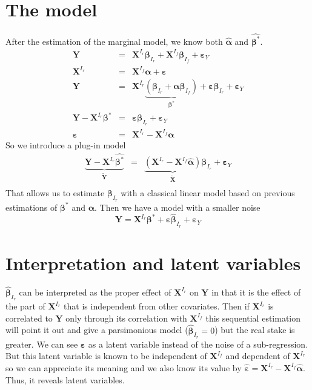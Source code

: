 \documentclass[12pt,a4paper]{report}
\begin{document}
	\section{The model}
		After the estimation of the marginal model, we know both $\hat{\boldsymbol{\alpha}}$ and $\hat{\boldsymbol{\beta}^*}$.
		\begin{eqnarray}
			\boldsymbol{Y}&=& \boldsymbol{X}^{I_r}\boldsymbol{\beta}_{I_r}+\boldsymbol{X}^{I_f}\boldsymbol{\beta}_{I_f}+\boldsymbol{\varepsilon}_Y \\
			\boldsymbol{X}^{I_r}&=&\boldsymbol{X}^{I_f}\boldsymbol{\alpha}+\boldsymbol{\varepsilon} \\
			\boldsymbol{Y}&=& \boldsymbol{X}^{I_r}\underbrace{(\boldsymbol{\beta}_{I_r}+\boldsymbol{\alpha}\boldsymbol{\beta}_{I_f})}_{\boldsymbol{\beta}^*}+\boldsymbol{\varepsilon}\boldsymbol{\beta}_{I_r}+\boldsymbol{\varepsilon}_Y \\
			\boldsymbol{Y}- \boldsymbol{X}^{I_r}\boldsymbol{\beta}^*&=&\boldsymbol{\varepsilon}\boldsymbol{\beta}_{I_r}+\boldsymbol{\varepsilon}_Y \\
			\boldsymbol{\varepsilon}&=&\boldsymbol{X}^{I_r}-\boldsymbol{X}^{I_f}\boldsymbol{\alpha}
		\end{eqnarray}		 
		So we introduce a plug-in model
		\begin{eqnarray}
			\underbrace{\boldsymbol{Y}- \boldsymbol{X}^{I_r}\hat{\boldsymbol{\beta}^*}}_{\tilde{\boldsymbol{Y}}}&=&\underbrace{(\boldsymbol{X}^{I_r}-\boldsymbol{X}^{I_f}\hat{\boldsymbol{\alpha}})}_{\tilde{\boldsymbol{X}}}\boldsymbol{\beta}_{I_r}+\boldsymbol{\varepsilon}_Y \\
		\end{eqnarray}
		That allows us to estimate $\boldsymbol{\beta}_{I_r}$ with a classical linear model based on previous estimations of $\boldsymbol{\beta}^*$ and $\boldsymbol{\alpha}$.
		Then we have a model with a smaller noise
		\begin{equation}
			\boldsymbol{Y}= \boldsymbol{X}^{I_r}\boldsymbol{\beta}^* + \boldsymbol{\varepsilon}\hat{\boldsymbol{\beta}}_{I_r}+\boldsymbol{\varepsilon}_Y 
		\end{equation}
	\section{Interpretation and latent variables}
			$\hat{\boldsymbol{\beta}}_{I_r}$ can be interpreted as the proper effect of $\boldsymbol{X}^{I_r}$ on $\boldsymbol{Y}$ in that it is the effect of the part of $\boldsymbol{X}^{I_r}$ that is independent from other covariates. Then if $\boldsymbol{X}^{I_r}$ is correlated to $\boldsymbol{Y}$ only through its correlation with $\boldsymbol{X}^{I_f}$ this sequential estimation will point it out and give a parsimonious model ($\hat{\boldsymbol{\beta}}_{I_r}=0$) but the real stake is greater. We can see $\boldsymbol{\varepsilon}$ as a latent variable instead of the noise of a sub-regression. But this latent variable is known to be independent of $\boldsymbol{X}^{I_f}$ and dependent of $\boldsymbol{X}^{I_r}$ so we can appreciate its meaning and we also know its value by $\hat{\boldsymbol{\varepsilon}}=\boldsymbol{X}^{I_r}-\boldsymbol{X}^{I_f}\hat{\boldsymbol{\alpha}}$. Thus, it reveals latent variables.
			
\end{document}
